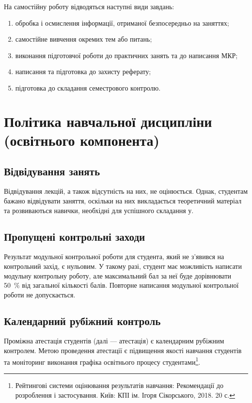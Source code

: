 \documentclass{Syllabus}
\begin{document}
На самостійну роботу відводяться наступні види завдань:
\begin{enumerate}[label=$\bullet$]
	\item обробка і осмислення інформації, отриманої безпосередньо на заняттях;
    \item самостійне вивчення окремих тем або питань;
	\item виконання підготовчої роботи до практичних занять та до написання МКР;
	\item написання та підготовка до захисту реферату;
	\item підготовка до складання семестрового контролю.
\end{enumerate}





\section{Політика навчальної дисципліни (освітнього компонента)}

\subsection*{Відвідування занять}
Відвідування лекцій, а також відсутність на них, не оцінюється. Однак, студентам бажано відвідувати заняття, оскільки на них викладається теоретичний матеріал та розвиваються навички, необхідні для успішного складання \control у.

\subsection*{Пропущені контрольні заходи}

Результат модульної контрольної роботи для студента, який не з’явився на контрольний захід, є нульовим. У такому разі, студент має можливість написати модульну контрольну роботу, але максимальний бал за неї буде дорівнювати 50~\% від загальної кількості балів. Повторне написання модульної контрольної роботи не допускається.

\subsection*{Календарний рубіжний контроль}

Проміжна атестація студентів (далі --- атестація) є календарним рубіжним контролем. Метою проведення атестації є підвищення якості навчання студентів та моніторинг виконання графіка освітнього процесу студентами\footnote{Рейтингові системи оцінювання результатів навчання: Рекомендації до розроблення і застосування. Київ: КПІ ім. Ігоря Сікорського, 2018. 20 с.}.
\end{document}
